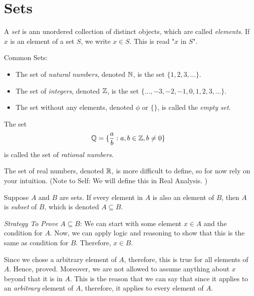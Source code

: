 \chapter{Sets}

\begin{definition}\label{set}
	A \emph{set} is ann unordered collection of distinct objects, which are called \emph{elements}.
	If $x$ is an element of a set $S$, we write $x \in S$. This is read "$x$ in $S$".
\end{definition}

\begin{definition}
	Common Sets:

	\begin{itemize}
		\item The set of \emph{natural numbers}, denoted $\mathbb{N}$, is the set $\{1, 2, 3, ...\}$.
		\item The set of \emph{integers}, denoted $\mathbb{Z}$, is the set $\{..., -3, -2, -1, 0, 1, 2, 3, ...\}$.
		\item The set without any elements, denoted $\phi$ or $\{\}$, is called the \emph{empty set}.
	\end{itemize}
\end{definition}

\begin{definition}\label{rational}
	The set $$\mathbb{Q} = \{ \frac{a}{b} : a, b \in \mathbb{Z}, b \neq 0 \}$$ is called the set of \emph{rational numbers}.
\end{definition}


The set of real numbers, denoted $\mathbb{R}$, is more difficult to define, so for now rely on your intuition. (Note to Self: We will define this in Real Analysis. )

\begin{definition}\label{subset}
	Suppose $A$ and $B$ are sets. If every element in $A$ is also an element of $B$, then $A$ is \emph{subset} of $B$, which is denoted $A \subseteq B$.
\end{definition}


\emph{Strategy To Prove $A \subseteq B$}: We can start with some element $x \in A$ and the condition for $A$. Now, we can apply logic and reasoning to show that this is the same as condition for $B$. Therefore, $x \in B$. 

Since we chose a arbitrary element of $A$, therefore, this is true for all elements of $A$. Hence, proved.
Moreover, we are not allowed to assume anything about $x$ beyond that it is in $A$. This is the reason that we can say that since it applies to an \emph{arbitrary} element of $A$, therefore, it applies to every element of $A$.


